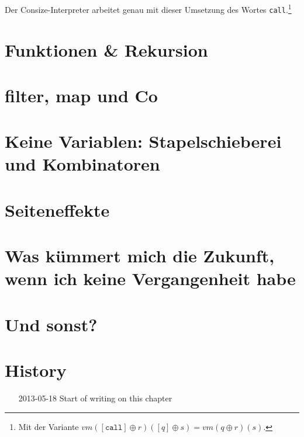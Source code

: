 Der Consize-Interpreter arbeitet genau mit dieser Umsetzung des Wortes \verb|call|.\footnote{Mit der Variante $vm([\mathtt{call}]\oplus r)([q]\oplus s)=vm(q\oplus r)(s)$.}






% 







\section{Funktionen \& Rekursion}

\section{filter, map und Co}

\section{Keine Variablen: Stapelschieberei und Kombinatoren}

\section{Seiteneffekte}

\section{Was kümmert mich die Zukunft, wenn ich keine Vergangenheit habe}

\section{Und sonst?}






\section*{History}
\begin{itemize}
\item[2013-05-18] Start of writing on this chapter
\end{itemize}

